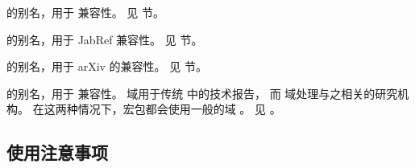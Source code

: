 \begin{fieldlist}

 的别名，用于 \BibTeX 兼容性。
见  节。




 的别名，用于 JabRef 兼容性。
见  节。




 的别名，用于 arXiv 的兼容性。
见  节。




 的别名，用于 \BibTeX 兼容性。
 域用于传统 \BibTeX 中的技术报告，
而  域处理与之相关的研究机构。
在这两种情况下，\biblatex 宏包都会使用一般的域 。
见 。

\end{fieldlist}


\subsection{使用注意事项}%
\label{bib:use}


